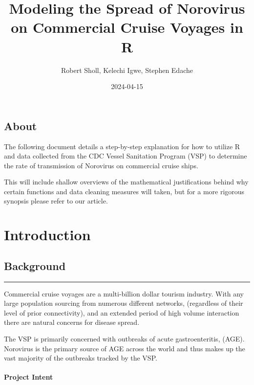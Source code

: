 \documentclass[
  11,
]{book}
\title{Modeling the Spread of Norovirus on Commercial Cruise Voyages in R}
\author{Robert Sholl, Kelechi Igwe, Stephen Edache}
\date{2024-04-15}
\begin{document}
\maketitle

{
\setcounter{tocdepth}{2}
\tableofcontents
}
\hypertarget{about}{%
\chapter*{About}\label{about}}


The following document details a step-by-step explanation for how to utilize R and data collected from the CDC Vessel Sanitation Program (VSP) to determine the rate of transmission of Norovirus on commercial cruise ships.

This will include shallow overviews of the mathematical justifications behind why certain functions and data cleaning measures will taken, but for a more rigorous synopsis please refer to our article.

\hypertarget{part-introduction}{%
\part{Introduction}\label{part-introduction}}

\hypertarget{background}{%
\chapter*{Background}\label{background}}


\begin{center}\rule{0.5\linewidth}{0.5pt}\end{center}

Commercial cruise voyages are a multi-billion dollar tourism industry. With any large population sourcing from numerous different networks, (regardless of their level of prior connectivity), and an extended period of high volume interaction there are natural concerns for disease spread.

The VSP is primarily concerned with outbreaks of acute gastroenteritis, (AGE). Norovirus is the primary source of AGE across the world and thus makes up the vast majority of the outbreaks tracked by the VSP.

\hypertarget{project-intent}{%
\subsection*{Project Intent}\label{project-intent}}
\end{document}

